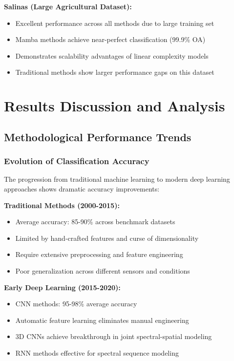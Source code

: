 \documentclass[journal]{IEEEtran}
\begin{document}
\textbf{Salinas (Large Agricultural Dataset):}
\begin{itemize}
\item Excellent performance across all methods due to large training set
\item Mamba methods achieve near-perfect classification (99.9\% OA)
\item Demonstrates scalability advantages of linear complexity models
\item Traditional methods show larger performance gaps on this dataset
\end{itemize}

\section{Results Discussion and Analysis}

\subsection{Methodological Performance Trends}

\subsubsection{Evolution of Classification Accuracy}

The progression from traditional machine learning to modern deep learning approaches shows dramatic accuracy improvements:

\textbf{Traditional Methods (2000-2015):}
\begin{itemize}
\item Average accuracy: 85-90\% across benchmark datasets
\item Limited by hand-crafted features and curse of dimensionality
\item Require extensive preprocessing and feature engineering
\item Poor generalization across different sensors and conditions
\end{itemize}

\textbf{Early Deep Learning (2015-2020):}
\begin{itemize}
\item CNN methods: 95-98\% average accuracy
\item Automatic feature learning eliminates manual engineering
\item 3D CNNs achieve breakthrough in joint spectral-spatial modeling
\item RNN methods effective for spectral sequence modeling
\end{itemize}
\end{document}
